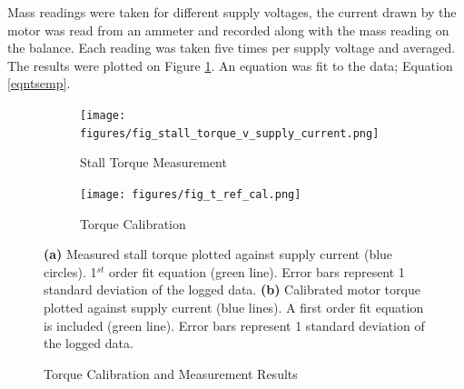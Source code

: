 \documentclass[twoside,a4]{report}
\begin{document}
	
	\noindent
	Mass readings were taken for different supply voltages, the current drawn by the motor was read from an ammeter and recorded along with the mass reading on the balance. Each reading was taken five times per supply voltage and averaged. The results were plotted on Figure \ref{figstalltcal}. An equation was fit to the data; Equation \ref{eqntsemp}.
	
	\begin{figure}[!htb]
		\centering
		\begin{subfigure}{0.45\textwidth}
			\texttt{[image: figures/fig\_stall\_torque\_v\_supply\_current.png]}
			\caption{Stall Torque Measurement}
			\label{figstalltcal}
		\end{subfigure}
		\begin{subfigure}{0.45\textwidth}
			\centering
			\texttt{[image: figures/fig\_t\_ref\_cal.png]}
			\caption{Torque Calibration}
			\label{figtcal}
		\end{subfigure}
		\caption{Torque Calibration and Measurement Results}
		\footnotesize
		\textbf{(a)} Measured stall torque plotted against supply current (blue circles). 1$^{st}$ order fit equation (green line). Error bars represent 1 standard deviation of the logged data.
		\textbf{(b)} Calibrated motor torque plotted against supply current (blue lines). A first order fit equation is included (green line). Error bars represent 1 standard deviation of the logged data.
	\end{figure}
	
\end{document}
